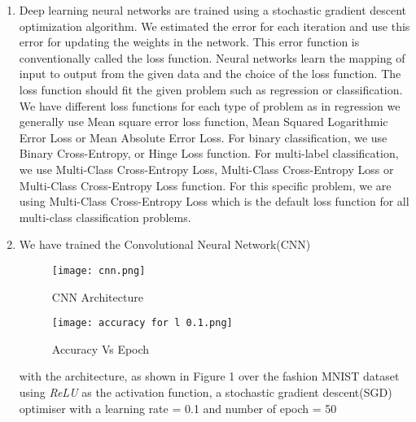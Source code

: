 \documentclass[11pt]{article}
\begin{document}
 \begin{enumerate}[label=(\alph*)]
	\item Deep learning neural networks are trained using a stochastic gradient descent optimization algorithm. We estimated the error for each iteration and use this error for updating the weights in the network. This error function is conventionally called the loss function. Neural networks learn the mapping of input to output from the given data and the choice of the loss function. The loss function should fit the given problem such as regression or classification. We have different loss functions for each type of problem as in regression we generally use Mean square error loss function, Mean Squared Logarithmic Error Loss or Mean Absolute Error Loss. For binary classification, we use Binary Cross-Entropy, or Hinge Loss function. For multi-label classification, we use Multi-Class Cross-Entropy Loss, Multi-Class Cross-Entropy Loss or Multi-Class Cross-Entropy Loss function. For this specific problem, we are using Multi-Class Cross-Entropy Loss which is the default loss function for all multi-class classification problems. 
	
	\item We have trained the Convolutional Neural Network(CNN)
	
	\begin{figure}[h]
	 \texttt{[image: cnn.png]}
	 \caption{ CNN Architecture }
	 \label{fig: arch}
	 
	 \texttt{[image: accuracy for l 0.1.png]}
	 \caption{ Accuracy Vs Epoch }
	 \label{fig:accuracy plot}
	\end{figure}
	with the  architecture, as shown in Figure 1 over the  fashion MNIST dataset using \textit{ReLU} as the activation function, a stochastic gradient descent(SGD) optimiser with a learning rate = 0.1 and number of epoch = 50
	

\end{enumerate}
\end{document}

